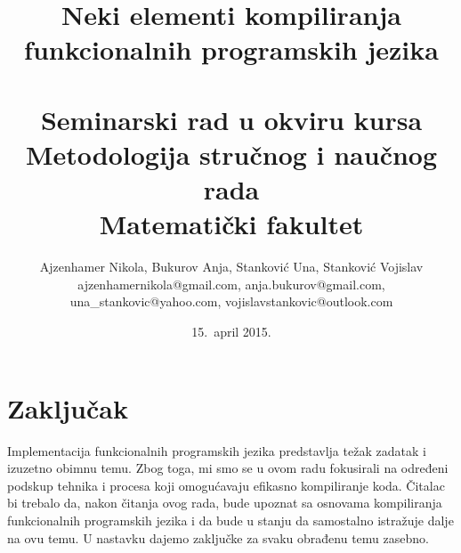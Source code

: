 \documentclass[a4paper]{article}
\begin{document}
\title{Neki elementi kompiliranja funkcionalnih programskih jezika\\ \small{~\\Seminarski rad u okviru kursa\\Metodologija stručnog i naučnog rada\\ Matematički fakultet}}

\author{
	Ajzenhamer Nikola, Bukurov Anja, Stanković Una, Stanković Vojislav\\
	ajzenhamernikola@gmail.com, anja.bukurov@gmail.com,\\
	una\_stankovic@yahoo.com, vojislavstankovic@outlook.com
	}
\date{15.~april 2015.}
\maketitle


\tableofcontents

\newpage









\section{Zaključak}
\label{sec:zakljucak}

Implementacija funkcionalnih programskih jezika predstavlja težak zadatak i izuzetno obimnu temu. Zbog toga, mi smo se u ovom radu fokusirali na određeni podskup tehnika i procesa koji omogućavaju efikasno kompiliranje koda. Čitalac bi trebalo da, nakon čitanja ovog rada, bude upoznat sa osnovama kompiliranja funkcionalnih programskih jezika i da bude u stanju da samostalno istražuje dalje na ovu temu. U nastavku dajemo zaključke za svaku obrađenu temu zasebno.
\end{document}
